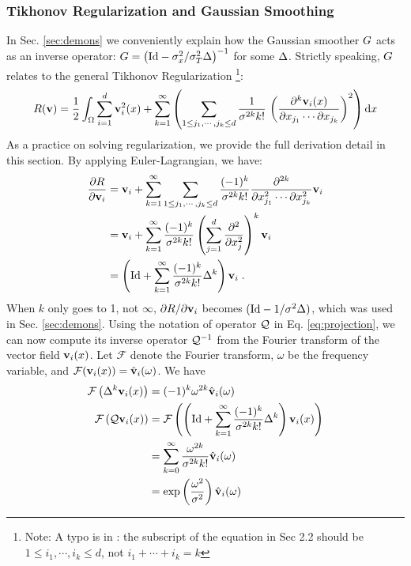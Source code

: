 \documentclass[letterpaper,12pt]{article}
\begin{document}
\subsubsection*{Tikhonov Regularization and Gaussian Smoothing}
\label{sec:gaussian}
In Sec. \ref{sec:demons} we conveniently explain how the Gaussian
smoother ${G}$ acts as an inverse operator: ${G} = \left( \text{Id} -
  {\sigma_x^2}/{\sigma_T^2} \Delta \right)^{-1}$ for some $\Delta$. Strictly speaking, ${G}$ relates to the general Tikhonov Regularization \cite{Nielsen1997,Mansi2010}\footnote{Note: A typo is in \cite{Mansi2010}: the subscript of the equation in Sec 2.2 should be $1 \leq i_1, \cdots, i_k \leq d$, not $i_1 + \cdots + i_k=k$}:
\begin{align}
R(\mathbf{v}) = \frac{1}{2} \int_\Omega \sum_{i=1}^d
\mathbf{v}_i^2(x) + 
\sum_{k=1}^{\infty}
\left(
\sum_{1 \leq j_1, \cdots, j_k \leq d}
\frac{1}{\sigma^{2k} k!} \,
\left(
\frac{\partial^k \mathbf{v}_i(x)}{\partial x_{j_1} \cdots \partial x_{j_k}}
\right)^2
\right)
\text{d} x
\end{align}
As a practice on solving regularization, we provide the full derivation detail in this section. By applying Euler-Lagrangian, we have:
\begin{equation}
\begin{split}
\frac{\partial R}{\partial \mathbf{v}_i} & = \mathbf{v}_i 
+ \sum_{k=1}^{\infty} 
\sum_{1 \leq j_1, \cdots, j_k \leq d}
\frac{(-1)^k}{\sigma^{2k}k!}
\frac{\partial^{2k}}{\partial x^2_{j_1} \cdots \partial x^2_{j_k}} \mathbf{v}_i \\
& =
\mathbf{v}_i 
+ \sum_{k=1}^{\infty} 
\frac{(-1)^k}{\sigma^{2k}k!}
\left(
\sum_{j=1}^{d}
\frac{\partial^{2}}{\partial x^2_{j}}  
\right)^k \mathbf{v}_i
\\
& = 
\left(
\text{Id} + \sum_{k=1}^{\infty} 
\frac{(-1)^k}{\sigma^{2k}k!}
\Delta^k
\right) \mathbf{v}_i \;.
\end{split}
\end{equation}
When $k$ only goes to 1, not $\infty$, $\partial R / \partial \mathbf{v}_i$ becomes $(\text{Id} - 1/\sigma^2 \Delta)$, which was used in Sec. \ref{sec:demons}. Using the notation of operator $\mathcal{Q}$ in Eq. \ref{eq:projection}, we can now compute its inverse operator $\mathcal{Q}^{-1}$ from the Fourier transform of the vector field $\mathbf{v}_i(x)$. Let $\mathcal{F}$ denote the Fourier transform, $\omega$ be the frequency variable, and $\mathcal{F}(\mathbf{v}_i(x)) = \hat{\mathbf{v}}_i(\omega)$. We have
\begin{equation}
\begin{split}
\mathcal{F}\left(
\Delta^k \mathbf{v}_i(x)
\right)
 & = (-1)^k \omega^{2k} \hat{\mathbf{v}}_i(\omega) 
\\
\mathcal{F}\left( \mathcal{Q} \mathbf{v}_i(x) \right) 
& = \mathcal{F}\left(
\left(
\text{Id} + \sum_{k=1}^{\infty} 
\frac{(-1)^k}{\sigma^{2k}k!}
\Delta^k
\right)
\mathbf{v}_i(x)
\right)
\\
& = 
\sum_{k=0}^{\infty} 
\frac{\omega^{2k}}{\sigma^{2k} k!} \hat{\mathbf{v}}_i(\omega)\\
& =
\exp \left(
\frac{\omega^2}{\sigma^2}
\right) \hat{\mathbf{v}}_i(\omega)
\end{split}
\end{equation}
\end{document}
